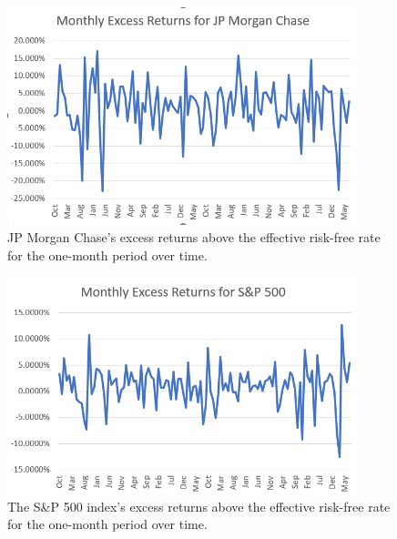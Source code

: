 \documentclass[12pt]{article}
\begin{document}
\begin{figure}[H]
\begin{center}
\includegraphics[width=4in]{images/jp-morgan-chase.png}
\end{center}
\caption{JP Morgan Chase's excess returns above the effective risk-free rate for the one-month period over time.\label{fig:jp-morgan-chase}}
\end{figure}
\begin{figure}[H]
\begin{center}
\includegraphics[width=4in]{images/spx.png}
\end{center}
\caption{The S\&P 500 index's excess returns above the effective risk-free rate for the one-month period over time.\label{fig:spx}}
\end{figure}
\end{document}
